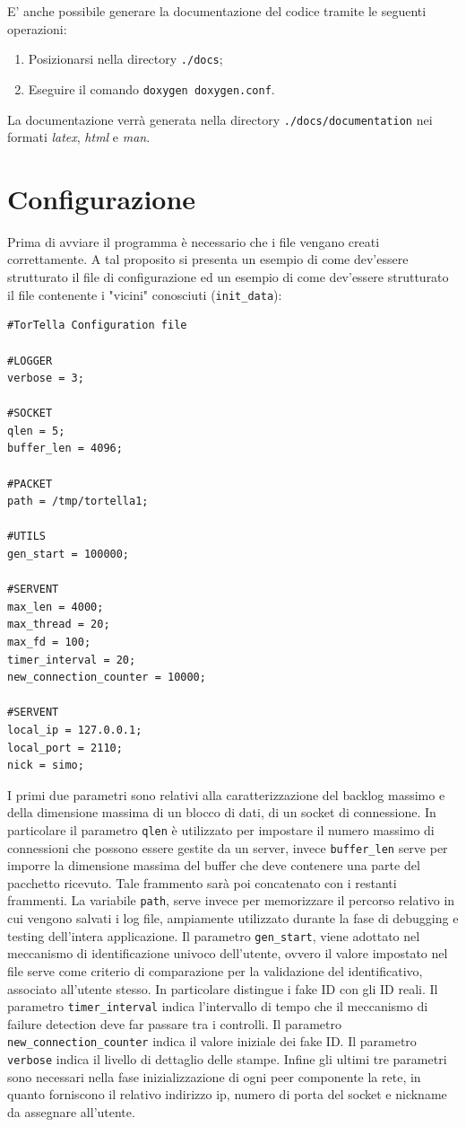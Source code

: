 E' anche possibile generare la documentazione del codice tramite le seguenti operazioni:
\begin{enumerate}
\item Posizionarsi nella directory \texttt{./docs};
\item Eseguire il comando \texttt{doxygen doxygen.conf}.
\end{enumerate}
La documentazione verrà generata nella directory \texttt{./docs/documentation} nei formati \textit{latex}, \textit{html} e \textit{man}.
\section{Configurazione}
Prima di avviare il programma è necessario che i file vengano creati correttamente. A tal proposito si presenta un esempio di come dev'essere strutturato il file di configurazione ed un esempio di come dev'essere strutturato il file contenente i "vicini" conosciuti (\texttt{init\_data}):
\begin{lstlisting}
#TorTella Configuration file

#LOGGER
verbose = 3;

#SOCKET
qlen = 5;
buffer_len = 4096;

#PACKET
path = /tmp/tortella1;

#UTILS
gen_start = 100000;

#SERVENT
max_len = 4000;
max_thread = 20;
max_fd = 100;
timer_interval = 20;
new_connection_counter = 10000;

#SERVENT
local_ip = 127.0.0.1;
local_port = 2110;
nick = simo;
\end{lstlisting}
I primi due parametri sono relativi alla caratterizzazione del backlog massimo e della dimensione massima di un blocco di dati, di un socket di connessione. In particolare il parametro \texttt{qlen} è utilizzato per impostare il numero massimo di  connessioni che possono essere gestite da un server, invece \texttt{buffer\_len} serve per imporre la dimensione massima del buffer che deve contenere una parte del pacchetto ricevuto. Tale frammento sarà poi concatenato con i restanti frammenti. La variabile \texttt{path}, serve invece per memorizzare il percorso relativo in cui vengono salvati i log file, ampiamente utilizzato durante la fase di debugging e testing dell'intera applicazione. Il parametro \texttt{gen\_start}, viene adottato nel meccanismo di identificazione univoco dell'utente, ovvero il valore impostato nel file serve come criterio di comparazione per la validazione del identificativo, associato all'utente stesso. In particolare distingue i fake ID con gli ID reali. Il parametro \texttt{timer\_interval} indica l'intervallo di tempo che il meccanismo di failure detection deve far passare tra i controlli. Il parametro \texttt{new\_connection\_counter} indica il valore iniziale dei fake ID. Il parametro \texttt{verbose} indica il livello di dettaglio delle stampe. Infine gli ultimi tre parametri sono necessari nella fase inizializzazione di ogni peer componente la rete, in quanto forniscono il relativo indirizzo ip, numero di porta del socket e nickname da assegnare all'utente.
